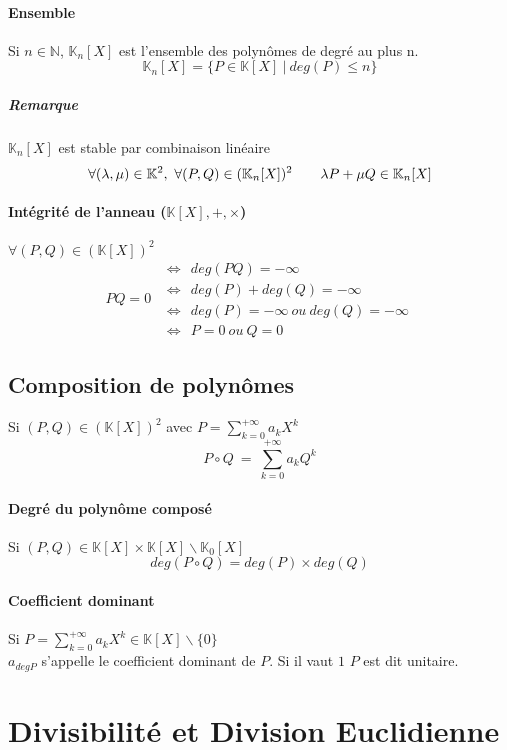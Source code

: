 			\paragraph{Ensemble}
			 Si $n\in\mathbb{N}$,
			 $\mathbb{K}_{n} [X]$ est l'ensemble des polynômes de degré au plus n.
			 \[ \mathbb{K}_{n} [X] = \{P\in\mathbb{K} [X] ~\vert ~ deg(P) \leq n\}\]
			 \subparagraph{Remarque}
			  $\mathbb{K}_{n} [X] $ est stable par combinaison linéaire
			  \[\forall (\lambda ,\mu )\in \mathbb{K}^{2} , ~\forall (P,Q)\in 
			  (\mathbb{K}_{n} [X])^{2} \hspace*{20pt} \lambda P+\mu Q \in\mathbb{K}_{n} [X]\]
			\paragraph{Intégrité de l'anneau ($\mathbb{K} [X],+,\times$)}
			 $\forall (P,Q) \in (\mathbb{K} [X] )^{2} $
			 \[ PQ = 0 ~\begin{array}{l}
			 ~\Leftrightarrow ~~deg(PQ) = -\infty \\
			 ~\Leftrightarrow ~~deg(P) + deg(Q) = -\infty \\
			 ~\Leftrightarrow ~~deg(P) = -\infty ~ou~ deg(Q) = -\infty \\
			 ~\Leftrightarrow ~~P=0 ~ou~ Q=0  
			 \end{array} \]	
			
		\subsection{Composition de polynômes}
			Si $(P,Q) \in (\mathbb{K} [X] )^{2}$ avec $P=\sum\limits_{k=0}^{+\infty} a_{k} X^{k}$
			\[P\circ Q ~=~ \sum\limits_{k=0}^{+\infty} a_{k} Q^{k} \]
			\paragraph{Degré du polynôme composé}
			 Si $(P,Q)\in \mathbb{K} [X] \times \mathbb{K} [X]\backslash \mathbb{K}_{0} [X]$
			 \[deg(P\circ Q) = deg(P) \times deg(Q)\]
			\paragraph{Coefficient dominant}
				Si $P=\sum\limits_{k=0}^{+\infty} a_k X^k \in \mathbb{K} [X] \backslash \{0\}$\\
				$a_{degP}$ s'appelle le coefficient dominant de $P$. 
				Si il vaut $1$ $P$ est dit unitaire.
	\section{Divisibilité et Division Euclidienne}
